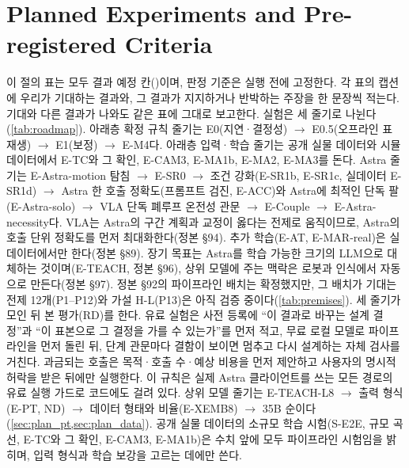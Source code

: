 \section{Planned Experiments and Pre-registered Criteria}
\label{sec:plan}

이 절의 표는 모두 결과 예정 칸(\todoexp)이며, 판정 기준은 실행 전에 고정한다. 각 표의 캡션에 우리가 기대하는 결과와, 그 결과가 지지하거나 반박하는 주장을 한 문장씩 적는다. 기대와 다른 결과가 나와도 같은 표에 그대로 보고한다. 실험은 세 줄기로 나뉜다(\cref{tab:roadmap}). 아래층 확정 규칙 줄기는 E0(지연·결정성) $\rightarrow$ E0.5(오프라인 표 재생) $\rightarrow$ E1(보정) $\rightarrow$ E-M4다. 아래층 입력·학습 줄기는 공개 실물 데이터와 시뮬 데이터에서 E-TC와 그 확인, E-CAM3, E-MA1b, E-MA2, E-MA3를 돈다. Astra 줄기는 E-Astra-motion 탐침 $\rightarrow$ E-SR0 $\rightarrow$ 조건 강화(E-SR1b, E-SR1c, 실데이터 E-SR1d) $\rightarrow$ Astra 한 호출 정확도(프롬프트 검진, E-ACC)와 Astra에 최적인 단독 팔(E-Astra-solo) $\rightarrow$ VLA 단독 폐루프 온전성 관문 $\rightarrow$ E-Couple $\rightarrow$ E-Astra-necessity다. VLA는 Astra의 구간 계획과 교정이 옳다는 전제로 움직이므로, Astra의 호출 단위 정확도를 먼저 최대화한다(정본 §94). 추가 학습(E-AT, E-MAR-real)은 실데이터에서만 한다(정본 §89). 장기 목표는 Astra를 학습 가능한 크기의 LLM으로 대체하는 것이며(E-TEACH, 정본 §96), 상위 모델에 주는 맥락은 로봇과 인식에서 자동으로 만든다(정본 §97). 정본 §92의 파이프라인 배치는 확정했지만, 그 배치가 기대는 전제 12개(P1--P12)와 가설 H-L(P13)은 아직 검증 중이다(\cref{tab:premises}). 세 줄기가 모인 뒤 본 평가(RD)를 한다. 유료 실험은 사전 등록에 ``이 결과로 바꾸는 설계 결정''과 ``이 표본으로 그 결정을 가를 수 있는가''를 먼저 적고, 무료 로컬 모델로 파이프라인을 먼저 돌린 뒤, 단계 관문마다 결함이 보이면 멈추고 다시 설계하는 자체 검사를 거친다. 과금되는 호출은 목적·호출 수·예상 비용을 먼저 제안하고 사용자의 명시적 허락을 받은 뒤에만 실행한다. 이 규칙은 실제 Astra 클라이언트를 쓰는 모든 경로의 유료 실행 가드로 코드에도 걸려 있다. 상위 모델 줄기는 E-TEACH-L8 $\rightarrow$ 출력 형식(E-PT, ND) $\rightarrow$ 데이터 형태와 비율(E-XEMB8) $\rightarrow$ 35B 순이다(\cref{sec:plan_pt,sec:plan_data}). 공개 실물 데이터의 소규모 학습 시험(S-E2E, 규모 곡선, E-TC와 그 확인, E-CAM3, E-MA1b)은 수치 앞에 모두 파이프라인 시험임을 밝히며, 입력 형식과 학습 보강을 고르는 데에만 쓴다.

